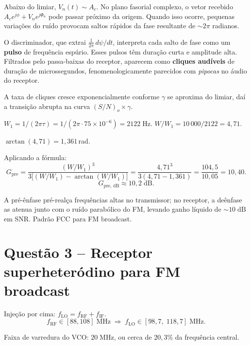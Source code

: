 \documentclass[11pt,a4paper]{article}
\begin{document}
\begin{resolucao}

Abaixo do limiar, $V_n(t) \sim A_c$. No plano fasorial complexo, o vetor recebido $A_c e^{j\phi} + V_n e^{j\Phi_n}$ pode passar próximo da origem. Quando isso ocorre, pequenas variações do ruído provocam saltos rápidos da fase resultante de $\sim 2\pi$ radianos.

O discriminador, que extrai $\tfrac{1}{2\pi}\,d\psi/dt$, interpreta cada salto de fase como um \textbf{pulso} de frequência espúrio. Esses pulsos têm duração curta e amplitude alta. Filtrados pelo passa-baixas do receptor, aparecem como \textbf{cliques audíveis} de duração de microssegundos, fenomenologicamente parecidos com \emph{pipocas} no áudio do receptor.

A taxa de cliques cresce exponencialmente conforme $\gamma$ se aproxima do limiar, daí a transição abrupta na curva $(S/N)_o\times\gamma$.
\end{resolucao}

\begin{resolucao}

$W_1 = 1/(2\pi\tau) = 1/(2\pi\cdot 75\times 10^{-6}) = 2122\;\text{Hz}$. $W/W_1 = 10\,000/2122 = 4{,}71$.

$\arctan(4{,}71) = 1{,}361$\,rad.

Aplicando a fórmula:
\[
  G_{\text{pre}} = \frac{(W/W_1)^3}{3\big[(W/W_1) - \arctan(W/W_1)\big]}
                = \frac{4{,}71^3}{3(4{,}71 - 1{,}361)}
                = \frac{104{,}5}{10{,}05}
                = 10{,}40.
\]
\[
  \boxed{G_{\text{pre, dB}} \approx 10{,}2\;\text{dB}.}
\]

A pré-ênfase pré-realça frequências altas no transmissor; no receptor, a deênfase as atenua junto com o ruído parabólico do FM, levando ganho líquido de $\sim 10\;\text{dB}$ em SNR. Padrão FCC para FM broadcast.
\end{resolucao}

\section*{Questão 3 -- Receptor superheteródino para FM broadcast}

\begin{resolucao}

Injeção por cima: $f_{\text{LO}} = f_{\text{RF}} + f_{\text{IF}}$.
\[
  f_{\text{RF}} \in [88, 108]\;\text{MHz} \;\Rightarrow\; f_{\text{LO}} \in [98{,}7,\;118{,}7]\;\text{MHz}.
\]

Faixa de varredura do VCO: $20\;\text{MHz}$, ou cerca de $20{,}3\%$ da frequência central.
\end{resolucao}
\end{document}
